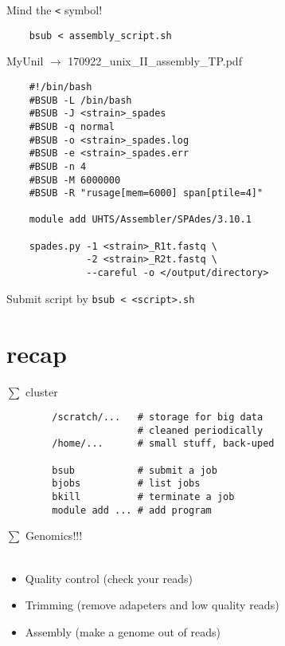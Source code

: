\documentclass[xcolor=dvipsnames]{beamer}
\begin{document}
\begin{frame}[fragile]
	\huge
	Mind the \verb!<! symbol!
	\begin{verbatim}
	bsub < assembly_script.sh
	\end{verbatim}
\end{frame}

\begin{frame}[fragile]
	\begin{center}
		\Large
		MyUnil $\rightarrow$ 170922\_unix\_II\_assembly\_TP.pdf
	\end{center}
\large
\begin{verbatim}
	#!/bin/bash
	#BSUB -L /bin/bash
	#BSUB -J <strain>_spades
	#BSUB -q normal
	#BSUB -o <strain>_spades.log
	#BSUB -e <strain>_spades.err
	#BSUB -n 4
	#BSUB -M 6000000
	#BSUB -R "rusage[mem=6000] span[ptile=4]"

	module add UHTS/Assembler/SPAdes/3.10.1

	spades.py -1 <strain>_R1t.fastq \
	          -2 <strain>_R2t.fastq \
	          --careful -o </output/directory>
\end{verbatim}

Submit script by \verb!bsub < <script>.sh!
\end{frame}


\section{recap}

\begin{frame}[fragile]
	\Huge
	$\sum$ cluster
	\Large
	\begin{verbatim}
		/scratch/...   # storage for big data
		               # cleaned periodically
		/home/...      # small stuff, back-uped

		bsub           # submit a job
		bjobs          # list jobs
		bkill          # terminate a job
		module add ... # add program
	\end{verbatim}
\end{frame}

\begin{frame}[fragile]
	\Huge
	$\sum$ Genomics!!! \\
	~ \\
	\Large
	\begin{itemize}
		\item Quality control (check your reads)
		\item Trimming (remove adapeters and low quality reads)
		\item Assembly (make a genome out of reads)
	\end{itemize}
\end{frame}
\end{document}
